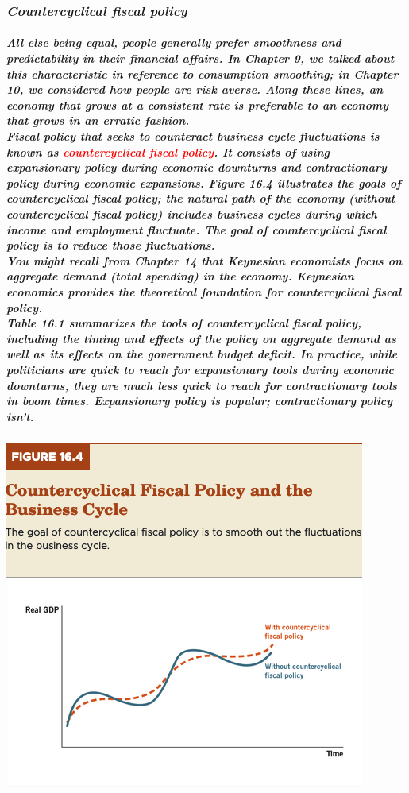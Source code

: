 \documentclass[11pt]{article} %
\begin{document}
\subsubsection*{\textit{Countercyclical fiscal policy}}
\subparagraph*{All else being equal, people generally prefer smoothness and predictability in their financial affairs. In Chapter 9, we talked about this characteristic in reference to consumption smoothing; in Chapter 10, we considered how people are risk averse. Along these lines, an economy that grows at a consistent rate is preferable to an economy that grows in an erratic fashion. \\Fiscal policy that seeks to counteract business cycle fluctuations is known as \textbf{\textcolor{red}{countercyclical fiscal policy}}. It consists of using expansionary policy during economic downturns and contractionary policy during economic expansions. Figure 16.4 illustrates the goals of countercyclical fiscal policy; the natural path of the economy (without countercyclical fiscal policy) includes business cycles during which income and employment fluctuate. The goal of countercyclical fiscal policy is to reduce those fluctuations. \\You might recall from Chapter 14 that Keynesian economists focus on aggregate demand (total spending) in the economy. Keynesian economics provides the theoretical foundation for countercyclical fiscal policy.\\Table 16.1 summarizes the tools of countercyclical fiscal policy, including the timing and effects of the policy on aggregate demand as well as its effects on the government budget deficit. In practice, while politicians are quick to reach for expansionary tools during economic downturns, they are much less quick to reach for contractionary tools in boom times. \textbf{\textit{Expansionary policy is popular; contractionary policy isn't.}}}
\begin{center}
\includegraphics[scale=0.5]{images/Figure 16.4.png} 
\end{center}
\end{document}
